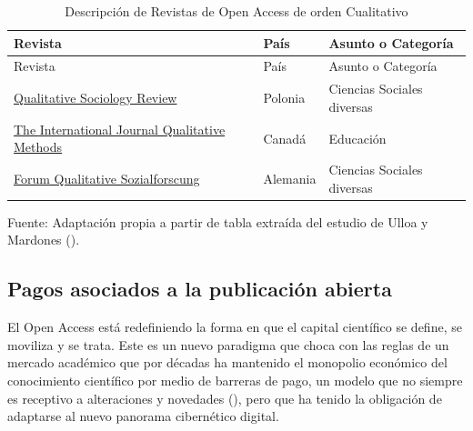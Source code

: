 \documentclass[
  spanish,
  a4paper,
  oneside]{scrbook}
\begin{document}
\begin{longtable}[]{@{}
  >{\raggedright\arraybackslash}p{}
  >{\raggedright\arraybackslash}p{}
  >{\raggedright\arraybackslash}p{}@{}}
\caption{Descripción de Revistas de Open Access de orden
Cualitativo}\label{tbl-revc}\tabularnewline
\toprule\noalign{}
\begin{minipage}[b]{\linewidth}\raggedright
Revista
\end{minipage} & \begin{minipage}[b]{\linewidth}\raggedright
País
\end{minipage} & \begin{minipage}[b]{\linewidth}\raggedright
Asunto o Categoría
\end{minipage} \\
\midrule\noalign{}
\endfirsthead
\toprule\noalign{}
\begin{minipage}[b]{\linewidth}\raggedright
Revista
\end{minipage} & \begin{minipage}[b]{\linewidth}\raggedright
País
\end{minipage} & \begin{minipage}[b]{\linewidth}\raggedright
Asunto o Categoría
\end{minipage} \\
\midrule\noalign{}
\endhead
\bottomrule\noalign{}
\endlastfoot
\href{http://www.qualitativesociologyreview.org}{Qualitative Sociology
Review} & Polonia & Ciencias Sociales diversas \\
\href{https://journals.sagepub.com/home/ijq}{The International Journal
Qualitative Methods} & Canadá & Educación \\
\href{https://www.qualitative-research.net/index.php/fqs}{Forum
Qualitative Sozialforscung} & Alemania & Ciencias Sociales diversas \\
\end{longtable}

Fuente: Adaptación propia a partir de tabla extraída del estudio de
Ulloa y Mardones ().

\subsection{Pagos asociados a la publicación
abierta}\label{pagos-asociados-a-la-publicaciuxf3n-abierta}

El Open Access está redefiniendo la forma en que el capital científico
se define, se moviliza y se trata. Este es un nuevo paradigma que choca
con las reglas de un mercado académico que por décadas ha mantenido el
monopolio económico del conocimiento científico por medio de barreras de
pago, un modelo que no siempre es receptivo a alteraciones y novedades
(), pero que ha tenido la
obligación de adaptarse al nuevo panorama cibernético digital.
\end{document}
